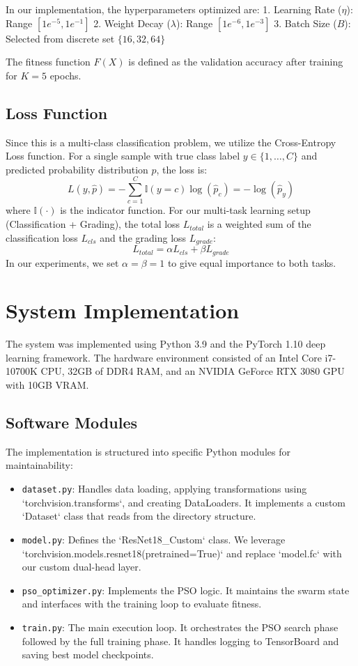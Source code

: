 \documentclass[11pt, a4paper]{article}
\begin{document}
In our implementation, the hyperparameters optimized are:
1. Learning Rate ($\eta$): Range $[1e^{-5}, 1e^{-1}]$
2. Weight Decay ($\lambda$): Range $[1e^{-6}, 1e^{-3}]$
3. Batch Size ($B$): Selected from discrete set $\{16, 32, 64\}$

The fitness function $F(X)$ is defined as the validation accuracy after training for $K=5$ epochs.

\subsection{Loss Function}
Since this is a multi-class classification problem, we utilize the Cross-Entropy Loss function. For a single sample with true class label $y \in \{1, \dots, C\}$ and predicted probability distribution $\hat{p}$, the loss is:
\begin{equation}
L(y, \hat{p}) = - \sum_{c=1}^{C} \mathbb{I}(y=c) \log(\hat{p}_c) = - \log(\hat{p}_y)
\end{equation}
where $\mathbb{I}(\cdot)$ is the indicator function.
For our multi-task learning setup (Classification + Grading), the total loss $L_{total}$ is a weighted sum of the classification loss $L_{cls}$ and the grading loss $L_{grade}$:
\begin{equation}
L_{total} = \alpha L_{cls} + \beta L_{grade}
\end{equation}
In our experiments, we set $\alpha = \beta = 1$ to give equal importance to both tasks.

\section{System Implementation}

The system was implemented using Python 3.9 and the PyTorch 1.10 deep learning framework. The hardware environment consisted of an Intel Core i7-10700K CPU, 32GB of DDR4 RAM, and an NVIDIA GeForce RTX 3080 GPU with 10GB VRAM.

\subsection{Software Modules}
The implementation is structured into specific Python modules for maintainability:
\begin{itemize}
    \item \texttt{dataset.py}: Handles data loading, applying transformations using `torchvision.transforms`, and creating DataLoaders. It implements a custom `Dataset` class that reads from the directory structure.
    \item \texttt{model.py}: Defines the `ResNet18_Custom` class. We leverage `torchvision.models.resnet18(pretrained=True)` and replace `model.fc` with our custom dual-head layer.
    \item \texttt{pso\_optimizer.py}: Implements the PSO logic. It maintains the swarm state and interfaces with the training loop to evaluate fitness.
    \item \texttt{train.py}: The main execution loop. It orchestrates the PSO search phase followed by the full training phase. It handles logging to TensorBoard and saving best model checkpoints.
\end{itemize}
\end{document}
